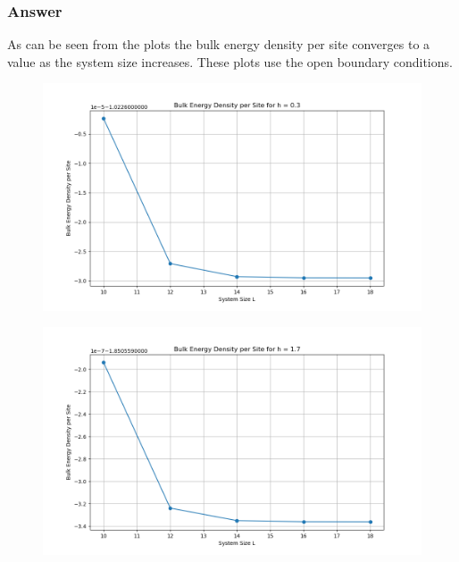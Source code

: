 \documentclass[12pt]{article}
\begin{document}
\subsubsection{Answer}
As can be seen from the plots the bulk energy density per site converges to a value as the system size increases. These plots use the open boundary conditions.
\begin{figure}
\centering
\includegraphics[width=\textwidth]{bulk_energy_density_h0.3.png}
\label{fig:bulk_energy_density}
\end{figure}
\begin{figure}
\centering
\includegraphics[width=\textwidth]{bulk_energy_density_h1.7.png}
\end{figure}
\end{document}
